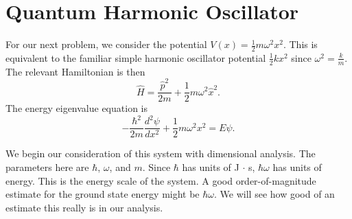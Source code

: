 \section{Quantum Harmonic Oscillator}
For our next problem, we consider the potential $V(x) = \frac{1}{2} m \omega^2 x^2$. This is equivalent to the familiar simple harmonic oscillator potential $\frac{1}{2} kx^2$ since $\omega^2 = \tfrac{k}{m}$. The relevant Hamiltonian is then 
\begin{equation}
    \hat{H} = \frac{\hat{p}^2}{2m} + \frac{1}{2} m\omega^2 \hat{x}^2 \label{shoH}.
\end{equation}
The energy eigenvalue equation is 
\begin{equation}
    -\frac{\hbar^2}{2m} \frac{d^2 \psi}{d x^2} + \frac{1}{2} m\omega^2 x^2 = E \psi.
    \label{schrodingerSHO}
\end{equation}

We begin our consideration of this system with dimensional analysis. The parameters here are $\hbar$, $\omega$, and $m$. Since $\hbar$ has units of J $\cdot$ s, $\hbar \omega$ has units of energy. This is the energy scale of the system. A good order-of-magnitude estimate for the ground state energy might be $\hbar \omega$. We will see how good of an estimate this really is in our analysis.


